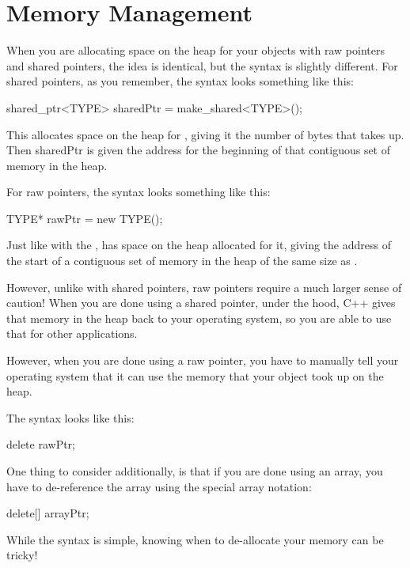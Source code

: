 \documentclass{tufte-handout}
\begin{document}
\section{Memory Management}
When you are allocating space on the heap for your objects with raw pointers and shared pointers, the idea is identical, but the syntax is slightly different.
For shared pointers, as you remember, the syntax looks something like this:
\begin{Code}
    shared_ptr<TYPE> sharedPtr = make_shared<TYPE>();
\end{Code}
This allocates space on the heap for , giving it the number of bytes that  takes up.
Then sharedPtr is given the address for the beginning of that contiguous set of memory in the heap.


For raw pointers, the syntax looks something like this:

\begin{Code}
    TYPE* rawPtr = new TYPE();
\end{Code}
Just like with the ,  has space on the heap allocated for it, giving  the address of the start of a contiguous set of memory in the heap of the same size as .


However, unlike with shared pointers, raw pointers require a much larger sense of caution!
When you are done using a shared pointer, under the hood, C++ gives that memory in the heap back to your operating system, so you are able to use that for other applications. 

However, when you are done using a raw pointer, you have to manually tell your operating system that it can use the memory that your object took up on the heap.

The syntax looks like this:

\begin{Code}
    delete rawPtr;
\end{Code}

One thing to consider additionally, is that if you are done using an array, you have to de-reference the array using the special array notation:

\begin{Code}
    delete[] arrayPtr;
\end{Code}


While the syntax is simple, knowing when to de-allocate your memory can be tricky!
\end{document}
